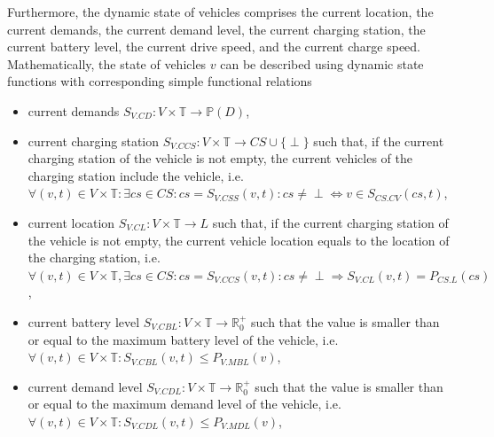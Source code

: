 \documentclass[graybox]{svmult}
\begin{document}
Furthermore, the dynamic state of vehicles comprises the current location, the current demands, the current demand level, the current charging station, the current battery level, the current drive speed, and the current charge speed.
Mathematically, the state of vehicles $v$ can be described using dynamic state functions with corresponding simple functional relations
\begin{itemize}
	\item current demands $S_{V.CD}: V \times \mathbb{T} \rightarrow \mathbb{P}(D)$,
	\item current charging station $S_{V.CCS}: V \times \mathbb{T} \rightarrow CS \cup \{\perp\}$ such that, if the current charging station of the vehicle is not empty, the current vehicles of the charging station include the vehicle, i.e.\ $\forall (v,t) \in V \times \mathbb{T}: \exists cs \in CS: cs = S_{V.CSS}(v,t): cs \neq \perp \Leftrightarrow v \in S_{CS.CV}(cs,t)$,
	\item current location $S_{V.CL}: V \times \mathbb{T} \rightarrow L$ such that, if the current charging station of the vehicle is not empty, the current vehicle location equals to the location of the charging station, i.e.\ $\forall (v,t) \in V \times \mathbb{T}, \exists cs \in CS: cs = S_{V.CCS}(v,t): cs \neq \perp \Rightarrow S_{V.CL}(v,t)=P_{CS.L}(cs)$,
	\item current battery level $S_{V.CBL}: V \times \mathbb{T} \rightarrow \mathbb{R}_0^+$ such that the value is smaller than or equal to the maximum battery level of the vehicle, i.e.\ $\forall (v,t) \in V \times \mathbb{T}: S_{V.CBL}(v,t) \leq P_{V.MBL}(v)$,
	\item current demand level $S_{V.CDL}: V \times \mathbb{T} \rightarrow \mathbb{R}_0^+$ such that the value is smaller than or equal to the maximum demand level of the vehicle, i.e.\ $\forall (v,t) \in V \times \mathbb{T}: S_{V.CDL}(v,t) \leq P_{V.MDL}(v)$,
	
	
	
\end{itemize}
\end{document}
